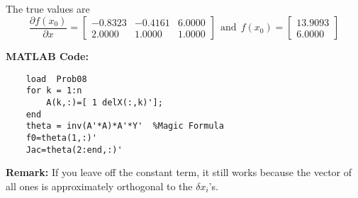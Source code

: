 \documentclass[letterpaper]{article}
\begin{document}
\begin{enumerate}
 The true values are $$ \frac{\partial f(x_0)}{\partial x} =\left[ \begin{array}{rrr}-0.8323& -0.4161& 6.0000\\2.0000& 1.0000& 1.0000\end{array} \right]~~\text{and}~~f(x_0) = \left[ \begin{array}{r}13.9093\\6.0000\end{array} \right]$$

 \textbf{MATLAB Code:}
 \begin{verbatim}
    load  Prob08
    for k = 1:n
        A(k,:)=[ 1 delX(:,k)'];
    end
    theta = inv(A'*A)*A'*Y'  %Magic Formula
    f0=theta(1,:)'
    Jac=theta(2:end,:)'
 \end{verbatim}

\textbf{Remark:} If you leave off the constant term, it still works because the vector of all ones is approximately orthogonal to the $\delta x_i$'s.

\end{enumerate}
\end{document}
